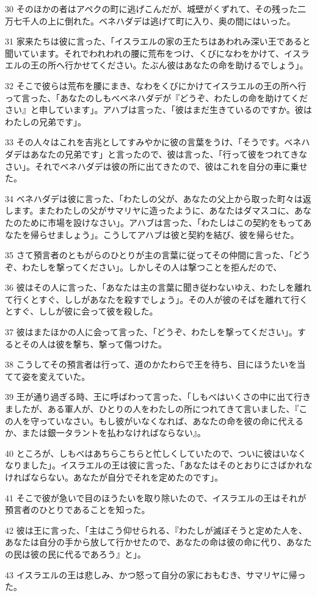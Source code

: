 \par 30 そのほかの者はアペクの町に逃げこんだが、城壁がくずれて、その残った二万七千人の上に倒れた。ベネハダデは逃げて町に入り、奥の間にはいった。
\par 31 家来たちは彼に言った、「イスラエルの家の王たちはあわれみ深い王であると聞いています。それでわれわれの腰に荒布をつけ、くびになわをかけて、イスラエルの王の所へ行かせてください。たぶん彼はあなたの命を助けるでしょう」。
\par 32 そこで彼らは荒布を腰にまき、なわをくびにかけてイスラエルの王の所へ行って言った、「あなたのしもべベネハダデが『どうぞ、わたしの命を助けてください』と申しています」。アハブは言った、「彼はまだ生きているのですか。彼はわたしの兄弟です」。
\par 33 その人々はこれを吉兆としてすみやかに彼の言葉をうけ、「そうです。ベネハダデはあなたの兄弟です」と言ったので、彼は言った、「行って彼をつれてきなさい」。それでベネハダデは彼の所に出てきたので、彼はこれを自分の車に乗せた。
\par 34 ベネハダデは彼に言った、「わたしの父が、あなたの父上から取った町々は返します。またわたしの父がサマリヤに造ったように、あなたはダマスコに、あなたのために市場を設けなさい」。アハブは言った、「わたしはこの契約をもってあなたを帰らせましょう」。こうしてアハブは彼と契約を結び、彼を帰らせた。
\par 35 さて預言者のともがらのひとりが主の言葉に従ってその仲間に言った、「どうぞ、わたしを撃ってください」。しかしその人は撃つことを拒んだので、
\par 36 彼はその人に言った、「あなたは主の言葉に聞き従わないゆえ、わたしを離れて行くとすぐ、ししがあなたを殺すでしょう」。その人が彼のそばを離れて行くとすぐ、ししが彼に会って彼を殺した。
\par 37 彼はまたほかの人に会って言った、「どうぞ、わたしを撃ってください」。するとその人は彼を撃ち、撃って傷つけた。
\par 38 こうしてその預言者は行って、道のかたわらで王を待ち、目にほうたいを当てて姿を変えていた。
\par 39 王が通り過ぎる時、王に呼ばわって言った、「しもべはいくさの中に出て行きましたが、ある軍人が、ひとりの人をわたしの所につれてきて言いました、『この人を守っていなさい。もし彼がいなくなれば、あなたの命を彼の命に代えるか、または銀一タラントを払わなければならない』。
\par 40 ところが、しもべはあちらこちらと忙しくしていたので、ついに彼はいなくなりました」。イスラエルの王は彼に言った、「あなたはそのとおりにさばかれなければならない。あなたが自分でそれを定めたのです」。
\par 41 そこで彼が急いで目のほうたいを取り除いたので、イスラエルの王はそれが預言者のひとりであることを知った。
\par 42 彼は王に言った、「主はこう仰せられる、『わたしが滅ぼそうと定めた人を、あなたは自分の手から放して行かせたので、あなたの命は彼の命に代り、あなたの民は彼の民に代るであろう』と」。
\par 43 イスラエルの王は悲しみ、かつ怒って自分の家におもむき、サマリヤに帰った。

